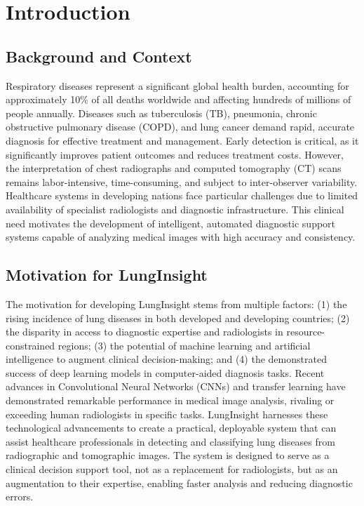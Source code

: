 \chapter{Introduction}\thispagestyle{empty}
\graphicspath{{Chapter1/figures/}}
{

\section{Background and Context}

Respiratory diseases represent a significant global health burden, accounting for approximately 10\% of all deaths worldwide and affecting hundreds of millions of people annually. Diseases such as tuberculosis (TB), pneumonia, chronic obstructive pulmonary disease (COPD), and lung cancer demand rapid, accurate diagnosis for effective treatment and management. Early detection is critical, as it significantly improves patient outcomes and reduces treatment costs. However, the interpretation of chest radiographs and computed tomography (CT) scans remains labor-intensive, time-consuming, and subject to inter-observer variability. Healthcare systems in developing nations face particular challenges due to limited availability of specialist radiologists and diagnostic infrastructure. This clinical need motivates the development of intelligent, automated diagnostic support systems capable of analyzing medical images with high accuracy and consistency.

\section{Motivation for LungInsight}

The motivation for developing LungInsight stems from multiple factors: (1) the rising incidence of lung diseases in both developed and developing countries; (2) the disparity in access to diagnostic expertise and radiologists in resource-constrained regions; (3) the potential of machine learning and artificial intelligence to augment clinical decision-making; and (4) the demonstrated success of deep learning models in computer-aided diagnosis tasks. Recent advances in Convolutional Neural Networks (CNNs) and transfer learning have demonstrated remarkable performance in medical image analysis, rivaling or exceeding human radiologists in specific tasks. LungInsight harnesses these technological advancements to create a practical, deployable system that can assist healthcare professionals in detecting and classifying lung diseases from radiographic and tomographic images. The system is designed to serve as a clinical decision support tool, not as a replacement for radiologists, but as an augmentation to their expertise, enabling faster analysis and reducing diagnostic errors.

}
